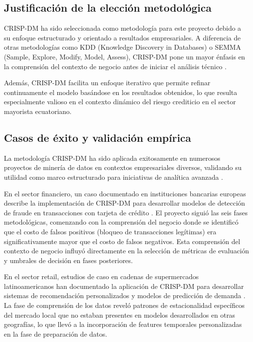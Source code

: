 \subsection{Justificación de la elección metodológica}
CRISP-DM ha sido seleccionada como metodología para este proyecto debido a su enfoque estructurado y orientado a resultados empresariales. A diferencia de otras metodologías como KDD (Knowledge Discovery in Databases) o SEMMA (Sample, Explore, Modify, Model, Assess), CRISP-DM pone un mayor énfasis en la comprensión del contexto de negocio antes de iniciar el análisis técnico \citep{martinez2019crisp}.

Además, CRISP-DM facilita un enfoque iterativo que permite refinar continuamente el modelo basándose en los resultados obtenidos, lo que resulta especialmente valioso en el contexto dinámico del riesgo crediticio en el sector mayorista ecuatoriano.

\subsection{Casos de éxito y validación empírica}
La metodología CRISP-DM ha sido aplicada exitosamente en numerosos proyectos de minería de datos en contextos empresariales diversos, validando su utilidad como marco estructurado para iniciativas de analítica avanzada \citep{martinez2019crisp}.

En el sector financiero, un caso documentado en instituciones bancarias europeas describe la implementación de CRISP-DM para desarrollar modelos de detección de fraude en transacciones con tarjeta de crédito \citep{wirth2000crisp}. El proyecto siguió las seis fases metodológicas, comenzando con la comprensión del negocio donde se identificó que el costo de falsos positivos (bloqueo de transacciones legítimas) era significativamente mayor que el costo de falsos negativos. Esta comprensión del contexto de negocio influyó directamente en la selección de métricas de evaluación y umbrales de decisión en fases posteriores.

En el sector retail, estudios de caso en cadenas de supermercados latinoamericanos han documentado la aplicación de CRISP-DM para desarrollar sistemas de recomendación personalizados y modelos de predicción de demanda \citep{chapman2000crisp}. La fase de comprensión de los datos reveló patrones de estacionalidad específicos del mercado local que no estaban presentes en modelos desarrollados en otras geografías, lo que llevó a la incorporación de features temporales personalizadas en la fase de preparación de datos.


